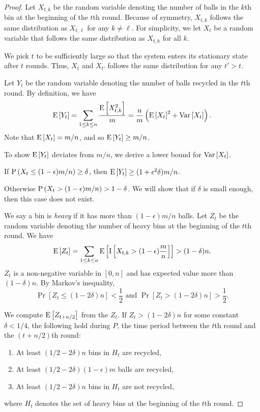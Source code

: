 \begin{proof}
	Let $X_{t, k}$ be the random variable denoting the number of balls in the
	$k$th bin at the beginning of the $t$th round. Because of symmetry,
	$X_{t, k}$ follows the same distribution as $X_{t, \ell}$ for any $k \ne
	\ell$.  For simplicity, we let $X_t$ be a random variable that follows the
	same distribution as $X_{t, k}$ for all $k$. 

	We pick $t$ to be sufficiently large so that the system enters its
	stationary state after $t$ rounds. Thus, $X_t$ and $X_{t'}$ follows the
	same distribution for any $t' > t$.

	Let $Y_t$ be the random variable denoting the number of balls recycled in
	the $t$th round. By definition, we have
	$$ \mathrm{E}\left[Y_t\right] = \sum_{1 \le k \le n}\frac{\mathrm{E}\left[X_{t, k}^2\right]}{m} =
	\frac{n}{m} \left( \mathrm{E}\left[X_t\right]^2 + \mathrm{Var}\left[X_t\right] \right).  $$
	Note that $\mathrm{E}\left[X_t\right] = m/n$, and so $\mathrm{E}\left[Y_t\right] \ge m/n$. 

	To show $\mathrm{E}\left[Y_t\right]$ deviates from $m/n$, we derive a lower bound for
	$\mathrm{Var}\left[X_t\right]$.

	If $\mathrm{P}\left(X_t \le (1-\epsilon)m/n\right) \ge \delta$, then $\mathrm{E}\left[Y_t\right] \ge
	(1+\epsilon^2\delta)m/n$.

	Otherwise $\mathrm{P}\left(X_t > (1-\epsilon)m/n \right) > 1-\delta$. We will show that if
	$\delta$ is small enough, then this case does not exist. 
		
	We say a bin is {\em heavy} if it has more than $(1-\epsilon)m/n$ balls.
	Let $Z_t$ be the random variable denoting the number of heavy bins at the
	beginning of the $t$th round. We have
	\begin{equation*}
		\mathrm{E}\left[Z_t\right] = \sum_{1 \le k \le n} \mathrm{E}\left[\mathrm{I}\left[X_{t, k} >
		(1-\epsilon)\frac{m}{n}\right]\right] > (1-\delta) n.
	\end{equation*}
	$Z_t$ is a non-negative variable in $[0, n]$ and has expected value more
	than $(1-\delta)n$. By Markov's inequality,
	\begin{equation*}
		\Pr[Z_t \le (1-2\delta)n] < \frac{1}{2} \mbox{ and } \Pr[Z_t >
		(1-2\delta)n] > \frac{1}{2}.
	\end{equation*}

	We compute $\mathrm{E}\left[Z_{t+n/2}\right]$ from the $Z_t$. If $Z_t > (1-2\delta)n$
	for some constant $\delta < 1/4$, the following hold during $P$, the time
	period between the $t$th round and the $(t+n/2)$th round:

	\begin{enumerate}
		\item At least $(1/2-2\delta)n$ bins in $H_t$ are recycled, 
		\item At least $(1/2-2\delta)(1-\epsilon)m$ balls are recycled,
		\item At least $(1/2-2\delta)n$ bins in $H_t$ are not recycled,
	\end{enumerate}
	where $H_t$ denotes the set of heavy bins at the beginning of the $t$th
	round.


\end{proof}
